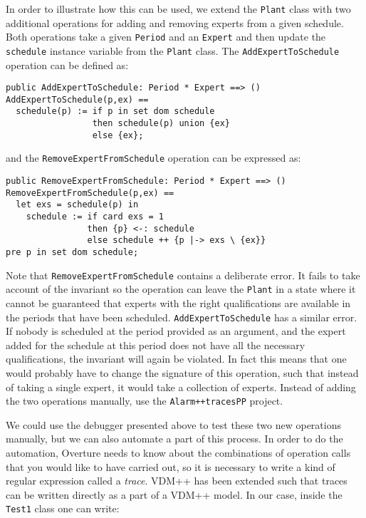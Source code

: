 In order to illustrate how this can be used, we extend the \texttt{Plant} class with two additional operations for adding and removing experts from a given schedule. Both operations take a given \texttt{Period} and an \texttt{Expert} and then update the \texttt{schedule} instance variable from the \texttt{Plant} class. The \texttt{AddExpertToSchedule} operation can be defined as:


\begin{lstlisting}
public AddExpertToSchedule: Period * Expert ==> ()
AddExpertToSchedule(p,ex) ==
  schedule(p) := if p in set dom schedule
                 then schedule(p) union {ex}
                 else {ex};
\end{lstlisting}

\noindent and the \texttt{RemoveExpertFromSchedule} operation can be expressed as:

\begin{lstlisting}
public RemoveExpertFromSchedule: Period * Expert ==> ()
RemoveExpertFromSchedule(p,ex) ==
  let exs = schedule(p) in
    schedule := if card exs = 1
                then {p} <-: schedule
                else schedule ++ {p |-> exs \ {ex}}
pre p in set dom schedule;
\end{lstlisting}

\noindent Note that \texttt{RemoveExpertFromSchedule} contains a deliberate error. It fails to take account of the invariant so the operation can leave the \texttt{Plant} in a state where it cannot be guaranteed that experts with the right qualifications are available in the periods that have been scheduled. \texttt{AddExpertToSchedule} has a similar error.  If nobody is scheduled at the period provided as an argument, and the expert added for the schedule at this period does not have all the necessary qualifications, the invariant will again be violated. In fact this means that one would probably have to change the signature of this operation, such that instead of taking a single expert, it would take a collection of experts. Instead of adding the two operations manually, use the \texttt{Alarm++tracesPP} project.

We could use the debugger presented above to test these two new operations manually, but we can also automate a part of this process. In order to do the automation, Overture needs to know about the combinations of operation calls that you would like to have carried out, so it is necessary to write a kind of regular expression called a \emph{trace}. VDM++ has been extended such that traces can be written directly as a part of a VDM++ model. In our case, inside the \texttt{Test1} class one can write:

